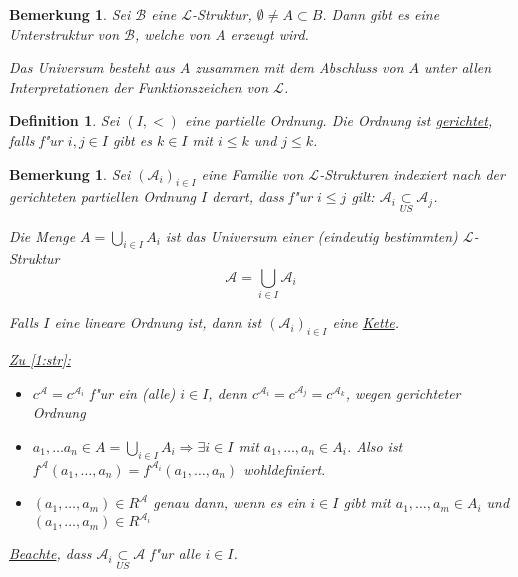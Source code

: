 \documentclass[a4paper,12pt,numbers=noenddot,parskip=full]{scrartcl}
\newcommand{\scrL}{\mathcal{L}}
\newcommand{\scrA}{\mathcal{A}}
\newcommand{\scrB}{\mathcal{B}}
\theoremstyle{dotless}
\newtheorem{definition}[theorem]{Definition}
\newtheorem{remark}[theorem]{Bemerkung}
\begin{document}
\begin{remark}
	Sei $\scrB$ eine $\scrL$-Struktur, $\emptyset \ne A \subset B$. Dann gibt es eine Unterstruktur von $\scrB$, welche von A erzeugt wird.
	
	Das Universum besteht aus $A$ zusammen mit dem Abschluss von $A$ unter allen Interpretationen der Funktionszeichen von $\scrL$.
\end{remark}

\begin{definition}
	Sei $(I, <)$ eine partielle Ordnung. Die Ordnung ist \underline{gerichtet}, falls f"ur $i, j \in I$ gibt es $k \in I$ mit $i \leq k$ und $j \leq k$.
\end{definition}

\begin{remark}
	Sei $(\scrA_i)_{i \in I}$ eine Familie von $\scrL$-Strukturen indexiert nach der gerichteten partiellen Ordnung $I$ derart, dass f"ur $i \leq j$ gilt: $\scrA_i \underset{US}{\subset} \scrA_j$.
	
	Die Menge $A=\underset{i \in I}{\bigcup} A_i$ ist das Universum einer (eindeutig bestimmten) $\scrL$-Struktur
	\begin{equation}
		\scrA = \underset{i \in I}{\bigcup} \scrA_i \label{1:str}
	\end{equation}
	
	Falls $I$ eine lineare Ordnung ist, dann ist $(\scrA_i)_{i \in I}$ eine \underline{Kette}.
	
	\underline{Zu \ref{1:str}:} \begin{itemize}
		\item $c^\scrA=c^{\scrA_i}$ f"ur ein (alle) $i \in I$, denn $c^{\scrA_i}=c^{\scrA_j}=c^{\scrA_k}$, {wegen gerichteter Ordnung}
		\item $a_1, \dots a_n \in A = \underset{i \in I}{\bigcup} A_i \Longrightarrow \exists i \in I$ mit $a_1, \dots, a_n \in A_i$.
		Also ist $f^\scrA (a_1, \dots, a_n) = f^{\scrA_i} (a_1, \dots, a_n)$ wohldefiniert.
		\item $(a_1, \dots, a_m) \in R^\scrA$ genau dann, wenn es ein $i \in I$ gibt mit $a_1, \dots, a_m \in A_i$ und $(a_1, \dots, a_m) \in R^{\scrA_i}$
	\end{itemize}

	\underline{Beachte}, dass $\scrA_i \underset{US}{\subset} \scrA$ f"ur alle $i \in I$.
\end{remark}
\end{document}
